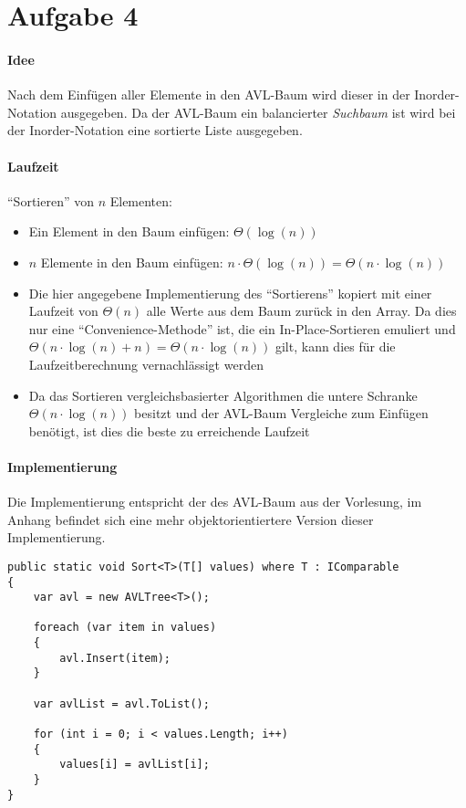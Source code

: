 \section*{Aufgabe 4}
\paragraph{Idee} Nach dem Einfügen aller Elemente in den AVL-Baum wird dieser in der Inorder-Notation ausgegeben. Da der AVL-Baum ein balancierter \textit{Suchbaum} ist wird bei der Inorder-Notation eine sortierte Liste ausgegeben. 

\paragraph{Laufzeit} \enquote{Sortieren} von $n$ Elementen: 
\begin{itemize}[nolistsep, noitemsep]
	\item Ein Element in den Baum einfügen: $\Theta(\log(n))$
    \item $n$ Elemente in den Baum einfügen: $n \cdot \Theta(\log(n)) = \Theta(n \cdot \log(n))$
    \item Die hier angegebene Implementierung des \enquote{Sortierens} kopiert mit einer Laufzeit von $\Theta(n)$ alle Werte aus dem Baum zurück in den Array. Da dies nur eine \enquote{Convenience-Methode} ist, die ein In-Place-Sortieren emuliert und $\Theta(n\cdot \log(n) + n) = \Theta(n \cdot \log(n))$ gilt, kann dies für die Laufzeitberechnung vernachlässigt werden
    \item Da das Sortieren vergleichsbasierter Algorithmen die untere Schranke $\Theta(n \cdot \log(n))$ besitzt und der AVL-Baum Vergleiche zum Einfügen benötigt, ist dies die beste zu erreichende Laufzeit
\end{itemize}

\paragraph{Implementierung} Die Implementierung entspricht der des AVL-Baum aus der Vorlesung, im Anhang befindet sich eine mehr objektorientiertere Version dieser Implementierung. 

\begin{verbatim}
public static void Sort<T>(T[] values) where T : IComparable
{
    var avl = new AVLTree<T>();

    foreach (var item in values)
    {
        avl.Insert(item);
    }

    var avlList = avl.ToList();

    for (int i = 0; i < values.Length; i++)
    {
        values[i] = avlList[i];
    }
}
\end{verbatim}